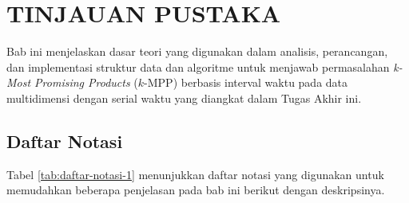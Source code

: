 
\chapter{TINJAUAN PUSTAKA} \label{chapter:tinjauan pustaka}
\tab Bab ini menjelaskan dasar teori yang digunakan dalam analisis, perancangan, dan implementasi struktur data dan algoritme untuk menjawab permasalahan \textit{k-Most Promising Products} ($k$-MPP) berbasis interval waktu pada data multidimensi dengan serial waktu yang diangkat dalam Tugas Akhir ini. 

\section{Daftar Notasi}
\tab Tabel \ref{tab:daftar-notasi-1} menunjukkan daftar notasi yang digunakan untuk memudahkan beberapa penjelasan pada bab ini berikut dengan deskripsinya.

